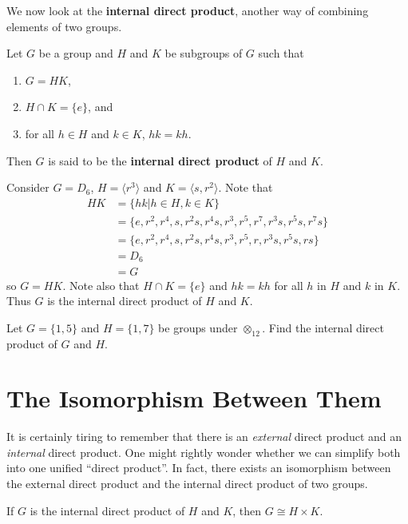 We now look at the \textbf{internal direct product}, another way of combining elements of two groups.

\begin{definition}
    Let $G$ be a group and $H$ and $K$ be subgroups of $G$ such that
    \begin{enumerate}
        \item $G = HK$,
        \item $H \cap K = \{e\}$, and
        \item for all $h \in H$ and $k \in K$, $hk = kh$.
    \end{enumerate}
    Then $G$ is said to be the \textbf{internal direct product} of $H$ and $K$.
\end{definition}

\begin{example}
    Consider $G = D_6$, $H = \langle r^3 \rangle$ and $K = \langle s, r^2 \rangle$. Note that
    \begin{align*}
        HK &= \{hk \vert h \in H, k \in K\}\\
        &= \{e, r^2, r^4, s, r^2s, r^4s, r^3, r^5, r^7, r^3s, r^5s, r^7s\}\\
        &= \{e, r^2, r^4, s, r^2s, r^4s, r^3, r^5, r, r^3s, r^5s, rs\}\\
        &= D_6\\
        &= G
    \end{align*}
    so $G = HK$. Note also that $H \cap K = \{e\}$ and $hk = kh$ for all $h$ in $H$ and $k$ in $K$. Thus $G$ is the internal direct product of $H$ and $K$.
\end{example}

\begin{exercise}
    Let $G = \{1, 5\}$ and $H = \{1, 7\}$ be groups under $\otimes_{12}$. Find the internal direct product of $G$ and $H$.
\end{exercise}

\section{The Isomorphism Between Them}
It is certainly tiring to remember that there is an \textit{external} direct product and an \textit{internal} direct product. One might rightly wonder whether we can simplify both into one unified ``direct product''. In fact, there exists an isomorphism between the external direct product and the internal direct product of two groups.

\begin{theorem}\label{thrm-direct-product-equivilance}
    If $G$ is the internal direct product of $H$ and $K$, then $G \cong H \times K$.
\end{theorem}

